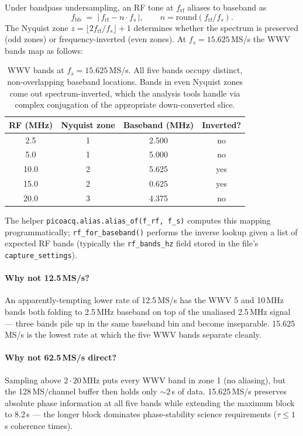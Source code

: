\documentclass[11pt]{article}
\begin{document}
Under bandpass undersampling, an RF tone at $f_\text{rf}$ aliases
to baseband as
\begin{equation*}
  f_\text{bb} \;=\; \bigl|\, f_\text{rf} - n \cdot f_s \,\bigr|,
  \qquad n = \mathrm{round}(f_\text{rf} / f_s).
\end{equation*}
The Nyquist zone $z = \lfloor 2 f_\text{rf}/f_s \rfloor + 1$
determines whether the spectrum is preserved (odd zones) or
frequency-inverted (even zones).  At $f_s = 15.625$\,MS/s the WWV
bands map as follows:

\begin{table}[h]
\centering
\begin{tabular}{cccc}
\toprule
\textbf{RF (MHz)} & \textbf{Nyquist zone} & \textbf{Baseband (MHz)} & \textbf{Inverted?} \\
\midrule
 2.5  & 1 & 2.500 & no  \\
 5.0  & 1 & 5.000 & no  \\
10.0  & 2 & 5.625 & yes \\
15.0  & 2 & 0.625 & yes \\
20.0  & 3 & 4.375 & no  \\
\bottomrule
\end{tabular}
\caption{WWV bands at $f_s = 15.625$\,MS/s.  All five bands occupy
distinct, non-overlapping baseband locations.  Bands in even Nyquist
zones come out spectrum-inverted, which the analysis tools handle
via complex conjugation of the appropriate down-converted slice.}
\label{tab:alias}
\end{table}

The helper \texttt{picoacq.alias.alias\_of(f\_rf, f\_s)} computes
this mapping programmatically; \texttt{rf\_for\_baseband()} performs
the inverse lookup given a list of expected RF bands (typically the
\texttt{rf\_bands\_hz} field stored in the file's
\texttt{capture\_settings}).

\paragraph{Why not 12.5\,MS/s?}  An apparently-tempting lower rate of
12.5\,MS/s has the WWV 5 and 10\,MHz bands both folding to 2.5\,MHz
baseband on top of the unaliased 2.5\,MHz signal --- three bands pile
up in the same baseband bin and become inseparable.  15.625\,MS/s is
the lowest rate at which the five WWV bands separate cleanly.

\paragraph{Why not 62.5\,MS/s direct?}  Sampling above $2 \cdot 20$\,MHz
puts every WWV band in zone 1 (no aliasing), but the 128\,MS/channel
buffer then holds only $\sim 2$\,s of data.  15.625\,MS/s preserves
absolute phase information at all five bands while extending the
maximum block to 8.2\,s --- the longer block dominates phase-stability
science requirements ($\tau \le 1$\,s coherence times).
\end{document}
